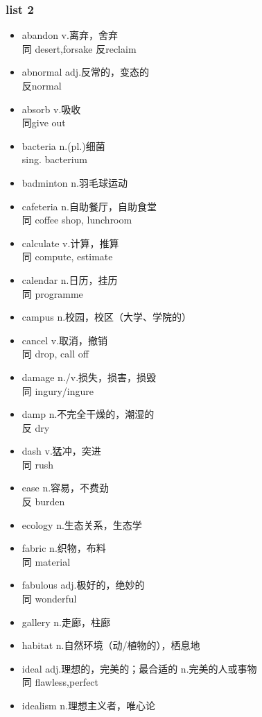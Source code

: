 \documentclass[11pt,a4paper,UTF8,titlepage]{ctexart} %
\begin{document}
    \subsubsection{list 2}
    \begin{multicols}{2}
        \begin{itemize}
            \item abandon v.离弃，舍弃\\同 desert,forsake 反reclaim
            \item abnormal adj.反常的，变态的\\反normal
            \item absorb v.吸收\\同give out
            \item bacteria n.(pl.)细菌\\sing. bacterium
            \item badminton n.羽毛球运动
            \item cafeteria n.自助餐厅，自助食堂\\同 coffee shop, lunchroom
            \item calculate v.计算，推算\\同 compute, estimate
            \item calendar n.日历，挂历\\同 programme
            \item campus n.校园，校区（大学、学院的）
            \item cancel v.取消，撤销\\同 drop, call off
            \item damage n./v.损失，损害，损毁\\同 ingury/ingure
            \item damp n.不完全干燥的，潮湿的\\反 dry
            \item dash v.猛冲，突进\\同 rush
            \item ease n.容易，不费劲\\反 burden
            \item ecology n.生态关系，生态学
            \item fabric n.织物，布料\\同 material
            \item fabulous adj.极好的，绝妙的\\同 wonderful
            \item gallery n.走廊，柱廊
            \item habitat n.自然环境（动/植物的），栖息地
            \item ideal adj.理想的，完美的；最合适的 n.完美的人或事物\\同 flawless,perfect
            \item idealism n.理想主义者，唯心论
        \end{itemize}
    \end{multicols}

    \ifx\collections\undefined
    \printbibliography %
    \clearpage %
    \printindex %
\end{document}
